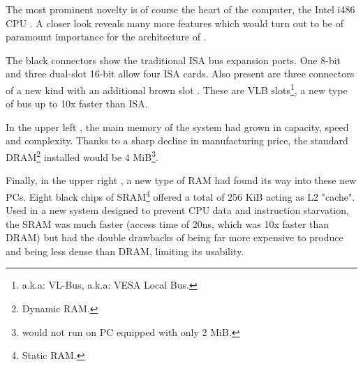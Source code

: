 \par
The most prominent novelty is of course the heart of the computer, the Intel i486 CPU . A closer look reveals many more features which would turn out to be of paramount importance for the architecture of \doom.\\
\par 
The black connectors show the traditional ISA bus expansion ports. One 8-bit  and three dual-slot 16-bit  allow four ISA cards. Also present are three connectors of a new kind with an additional brown slot . These are VLB slots\footnote{a.k.a: VL-Bus, a.k.a: VESA Local Bus.}, a new type of bus up to 10x faster than ISA.

\par
In the upper left , the main memory of the system had grown in capacity, speed and complexity. Thanks to a sharp decline in manufacturing price, the standard DRAM\footnote{Dynamic RAM.} installed would be 4 MiB\footnote{\doom{} would not run on PC equipped with only 2 MiB.}.\\
\par
 Finally, in the upper right , a new type of RAM had found its way into these new PCs. Eight black chips of SRAM\footnote{Static RAM.} offered a total of 256 KiB acting as L2 "cache". Used in a new system designed to prevent CPU data and instruction starvation, the SRAM was much faster (access time of 20ns, which was 10x faster than DRAM) but had the double drawbacks of being far more expensive to produce and being less dense than DRAM, limiting its usability.



